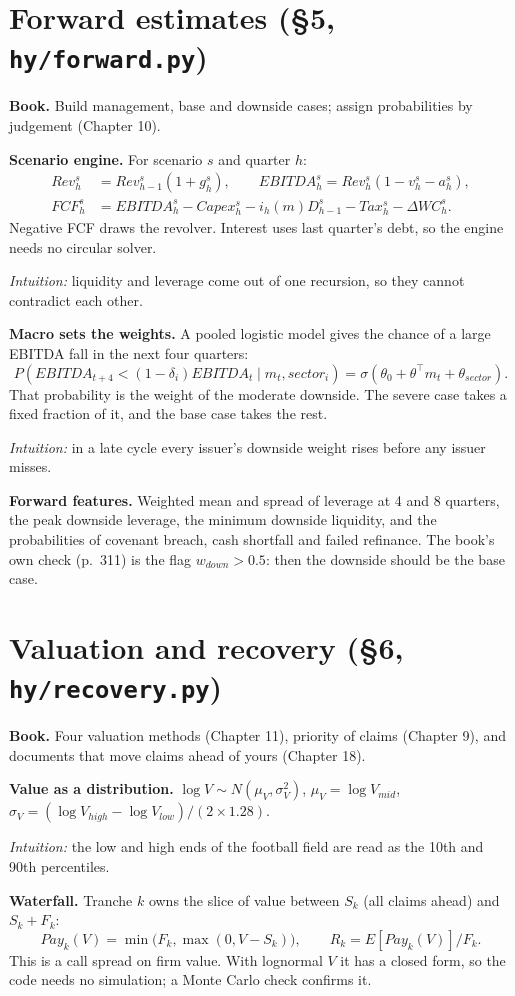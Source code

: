 \documentclass[11pt,a4paper]{article}
\newcommand{\code}[1]{\texttt{\small #1}}
\newcommand{\why}[1]{\par\noindent\textcolor{teal!60!black}{\textit{Intuition:} #1}\par}
\begin{document}
\section{Forward estimates (\S5, \code{hy/forward.py})}
\label{sec:forward}
\textbf{Book.} Build management, base and downside cases; assign probabilities by judgement (Chapter 10).

\textbf{Scenario engine.} For scenario $s$ and quarter $h$:
\begin{align*} Rev^s_h&=Rev^s_{h-1}(1+g^s_h),\qquad EBITDA^s_h=Rev^s_h(1-v^s_h-a^s_h),\\ FCF^s_h&=EBITDA^s_h-Capex^s_h-i_h(m)D^s_{h-1}-Tax^s_h-\Delta WC^s_h. \end{align*}
Negative FCF draws the revolver. Interest uses last quarter's debt, so the engine needs no circular solver.
\why{liquidity and leverage come out of one recursion, so they cannot contradict each other.}

\textbf{Macro sets the weights.} A pooled logistic model gives the chance of a large EBITDA fall in the next four quarters:
\[ P(EBITDA_{t+4}<(1-\delta_i)EBITDA_t\mid m_t,sector_i)=\sigma(\theta_0+\theta^\top m_t+\theta_{sector}). \]
That probability is the weight of the moderate downside. The severe case takes a fixed fraction of it, and the base case takes the rest.
\why{in a late cycle every issuer's downside weight rises before any issuer misses.}

\textbf{Forward features.} Weighted mean and spread of leverage at 4 and 8 quarters, the peak downside leverage, the minimum downside liquidity, and the probabilities of covenant breach, cash shortfall and failed refinance. The book's own check (p.~311) is the flag $w_{down}>0.5$: then the downside should be the base case.

\section{Valuation and recovery (\S6, \code{hy/recovery.py})}
\label{sec:recovery}
\textbf{Book.} Four valuation methods (Chapter 11), priority of claims (Chapter 9), and documents that move claims ahead of yours (Chapter 18).

\textbf{Value as a distribution.} $\log V\sim N(\mu_V,\sigma_V^2)$, $\mu_V=\log V_{mid}$, $\sigma_V=(\log V_{high}-\log V_{low})/(2\times1.28)$.
\why{the low and high ends of the football field are read as the 10th and 90th percentiles.}

\textbf{Waterfall.} Tranche $k$ owns the slice of value between $S_k$ (all claims ahead) and $S_k+F_k$:
\[ Pay_k(V)=\min\big(F_k,\max(0,V-S_k)\big),\qquad R_k=E[Pay_k(V)]/F_k. \]
This is a call spread on firm value. With lognormal $V$ it has a closed form, so the code needs no simulation; a Monte Carlo check confirms it.
\end{document}
